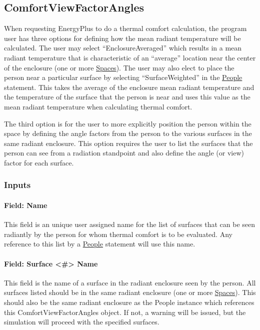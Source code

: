 \subsection{ComfortViewFactorAngles}\label{comfortviewfactorangles}

When requesting EnergyPlus to do a thermal comfort calculation, the program user has three options for defining how the mean radiant temperature will be calculated. The user may select ``EnclosureAveraged'' which results in a mean radiant temperature that is characteristic of an ``average'' location near the center of the enclosure  (one or more \hyperref[space]{Spaces}). The user may also elect to place the person near a particular surface by selecting ``SurfaceWeighted'' in the \hyperref[people]{People} statement. This takes the average of the enclosure mean radiant temperature and the temperature of the surface that the person is near and uses this value as the mean radiant temperature when calculating thermal comfort.

The third option is for the user to more explicitly position the person within the space by defining the angle factors from the person to the various surfaces in the same radiant enclosure. This option requires the user to list the surfaces that the person can see from a radiation standpoint and also define the angle (or view) factor for each surface.

\subsubsection{Inputs}\label{inputs-1-023}

\paragraph{Field: Name}\label{field-name-1-022}

This field is an unique user assigned name for the list of surfaces that can be seen radiantly by the person for whom thermal comfort is to be evaluated. Any reference to this list by a \hyperref[people]{People} statement will use this name.

\paragraph{Field: Surface \textless{}\#\textgreater{} Name}\label{field-surface-name-002}

This field is the name of a surface in the radiant enclosure seen by the person. All surfaces listed should be in the same radiant enclosure (one or more \hyperref[space]{Spaces}). This should also be the same radiant enclosure as the People instance which references this ComfortViewFactorAngles object. If not, a warning will be issued, but the simulation will proceed with the specified surfaces.

